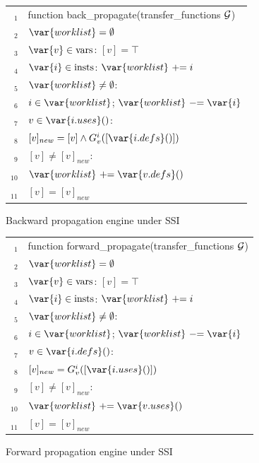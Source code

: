 \newcommand\val[1]{[#1]}
\begin{algorithm}[t!]
\begin{tabular}{rl}
$_1$ & \textsf{function back\_propagate}(transfer\_functions $\cal G$)\\
$_2$ & \1$\var{worklist} = \emptyset$\\
$_3$ & \1\Foreach $\var{v} \in \textrm{vars}$: $\val{v}=\top$\\
$_4$ & \1\Foreach $\var{i} \in \textrm{insts}$: $\var{worklist}\ +\hspace{-0.3em}= i$\\
$_5$ & \1\While $\var{worklist}\neq \emptyset$:\\
$_6$ & \1\1 \Let $i \in \var{worklist}$; $\var{worklist}\ -\hspace{-0.3em}= \var{i}$\\
$_7$ & \1\1 \Foreach $v \in \var{i.uses}()$:\\
$_8$ & \1  \2  $\val{v}_{new} = \val{v} \wedge G_v^i(\val{\var{i.defs}()})$\\
$_9$ &  \1 \2  \If $\val{v} \neq \val{v}_{new}$: \\
$_{10}$& \1   \3 $\var{worklist}\ +\hspace{-0.3em}=\var{v.defs}()$\\
$_{11}$& \1   \3 $\val{v} = \val{v}_{new}$\\
\end{tabular}
\caption{\label{alg:ssi:propback} Backward propagation engine under SSI}
\end{algorithm}

\begin{algorithm}[t!]
\begin{tabular}{rl}
$_1$ & \textsf{function forward\_propagate}(transfer\_functions $\cal G$)\\
$_2$ & \1$\var{worklist} = \emptyset$\\
$_3$ & \1\Foreach $\var{v} \in \textrm{vars}$: $\val{v}=\top$\\
$_4$ & \1\Foreach $\var{i} \in \textrm{insts}$: $\var{worklist}\ +\hspace{-0.3em}= i$\\
$_5$ & \1\While $\var{worklist}\neq \emptyset$:\\
$_6$ & \1\1 \Let $i \in \var{worklist}$; $\var{worklist}\ -\hspace{-0.3em}= \var{i}$\\
$_7$ & \1\1 \Foreach $v \in \var{i.defs}()$:\\
$_8$ & \1  \2  $\val{v}_{new} =  G_v^i(\val{\var{i.uses}()})$\\
$_9$ &  \1 \2  \If $\val{v} \neq \val{v}_{new}$: \\
$_{10}$& \1   \3 $\var{worklist}\ +\hspace{-0.3em}=\var{v.uses}()$\\
$_{11}$& \1   \3 $\val{v} = \val{v}_{new}$\\
\end{tabular}
\caption{\label{alg:ssi:propforward} Forward propagation engine under SSI}
\end{algorithm}

